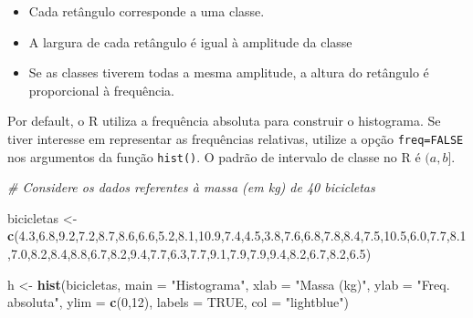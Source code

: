 \documentclass[
]{book}
\newenvironment{Shaded}{\begin{snugshade}}{\end{snugshade}}
\newcommand{\AttributeTok}[1]{\textcolor[rgb]{0.13,0.29,0.53}{#1}}
\newcommand{\CommentTok}[1]{\textcolor[rgb]{0.56,0.35,0.01}{\textit{#1}}}
\newcommand{\ConstantTok}[1]{\textcolor[rgb]{0.56,0.35,0.01}{#1}}
\newcommand{\DecValTok}[1]{\textcolor[rgb]{0.00,0.00,0.81}{#1}}
\newcommand{\FloatTok}[1]{\textcolor[rgb]{0.00,0.00,0.81}{#1}}
\newcommand{\FunctionTok}[1]{\textcolor[rgb]{0.13,0.29,0.53}{\textbf{#1}}}
\newcommand{\NormalTok}[1]{#1}
\newcommand{\OtherTok}[1]{\textcolor[rgb]{0.56,0.35,0.01}{#1}}
\newcommand{\StringTok}[1]{\textcolor[rgb]{0.31,0.60,0.02}{#1}}
\begin{document}
\begin{itemize}
\item
  Cada retângulo corresponde a uma classe.
\item
  A largura de cada retângulo é igual à amplitude da classe
\item
  Se as classes tiverem todas a mesma amplitude, a altura do retângulo é proporcional à frequência.
\end{itemize}

Por default, o R utiliza a frequência absoluta para construir o histograma. Se tiver interesse em representar as frequências relativas, utilize a opção \texttt{freq=FALSE} nos argumentos da função \texttt{hist()}. O padrão de intervalo de classe no R é \((a, b]\).

\begin{Shaded}
\begin{Highlighting}[]
\CommentTok{\# Considere os dados referentes à massa (em kg) de 40 bicicletas}

\NormalTok{bicicletas }\OtherTok{\textless{}{-}} \FunctionTok{c}\NormalTok{(}\FloatTok{4.3}\NormalTok{,}\FloatTok{6.8}\NormalTok{,}\FloatTok{9.2}\NormalTok{,}\FloatTok{7.2}\NormalTok{,}\FloatTok{8.7}\NormalTok{,}\FloatTok{8.6}\NormalTok{,}\FloatTok{6.6}\NormalTok{,}\FloatTok{5.2}\NormalTok{,}\FloatTok{8.1}\NormalTok{,}\FloatTok{10.9}\NormalTok{,}\FloatTok{7.4}\NormalTok{,}\FloatTok{4.5}\NormalTok{,}\FloatTok{3.8}\NormalTok{,}\FloatTok{7.6}\NormalTok{,}\FloatTok{6.8}\NormalTok{,}\FloatTok{7.8}\NormalTok{,}\FloatTok{8.4}\NormalTok{,}\FloatTok{7.5}\NormalTok{,}\FloatTok{10.5}\NormalTok{,}\FloatTok{6.0}\NormalTok{,}\FloatTok{7.7}\NormalTok{,}\FloatTok{8.1}\NormalTok{,}\FloatTok{7.0}\NormalTok{,}\FloatTok{8.2}\NormalTok{,}\FloatTok{8.4}\NormalTok{,}\FloatTok{8.8}\NormalTok{,}\FloatTok{6.7}\NormalTok{,}\FloatTok{8.2}\NormalTok{,}\FloatTok{9.4}\NormalTok{,}\FloatTok{7.7}\NormalTok{,}\FloatTok{6.3}\NormalTok{,}\FloatTok{7.7}\NormalTok{,}\FloatTok{9.1}\NormalTok{,}\FloatTok{7.9}\NormalTok{,}\FloatTok{7.9}\NormalTok{,}\FloatTok{9.4}\NormalTok{,}\FloatTok{8.2}\NormalTok{,}\FloatTok{6.7}\NormalTok{,}\FloatTok{8.2}\NormalTok{,}\FloatTok{6.5}\NormalTok{)}
  
\NormalTok{h }\OtherTok{\textless{}{-}} \FunctionTok{hist}\NormalTok{(bicicletas,     }
  \AttributeTok{main =} \StringTok{"Histograma"}\NormalTok{,     }
  \AttributeTok{xlab =} \StringTok{"Massa (kg)"}\NormalTok{,     }
  \AttributeTok{ylab =} \StringTok{"Freq. absoluta"}\NormalTok{,     }
  \AttributeTok{ylim =} \FunctionTok{c}\NormalTok{(}\DecValTok{0}\NormalTok{,}\DecValTok{12}\NormalTok{),     }
  \AttributeTok{labels =} \ConstantTok{TRUE}\NormalTok{,     }
  \AttributeTok{col =} \StringTok{"lightblue"}\NormalTok{)}
\end{Highlighting}
\end{Shaded}
\end{document}
